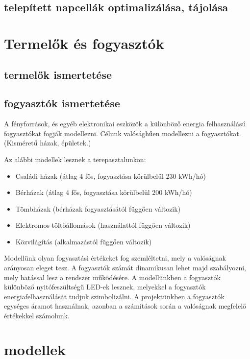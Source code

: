 \documentclass[
]{thesis-ekf}
\theoremstyle{definition}
\theoremstyle{remark}
\begin{document}
		\subsection{telepített napcellák optimalizálása, tájolása}
	\section{Termelők és fogyasztók}
		\subsection{termelők ismertetése}
		\subsection{fogyasztók ismertetése}
		\par A fényforrások, és egyéb elektronikai eszközök a különböző energia felhasználású fogyasztókat fogják modellezni. Célunk valósághűen modellezni a fogyasztókat. (Kisméretű házak, épületek.) 
		\par Az alábbi modellek lesznek a terepasztalunkon:
		\begin{itemize}
			\item Családi házak (átlag 4 fős, fogyasztása körülbelül 230 kWh/hó)
			\item Bérházak (átlag 4 fős, fogyasztása körülbelül 200 kWh/hó)
			\item Tömbházak (bérházak fogyasztásától függően változik)
			\item Elektromos töltőállomások (használattól függően változik)
			\item Közvilágítás (alkalmazástól függően változik)
		\end{itemize}
	
		Modellünk olyan fogyasztási értékeket fog szemléltetni, mely a valóságnak arányosan eleget tesz. A fogyasztók számát dinamikusan lehet majd szabályozni, mely hatással lesz a rendszer működésére. A modellünkben a fogyasztók különböző nyitófeszültségű LED-ek lesznek, melyekkel a fogyasztók energiafelhasználását tudjuk szimbolizálni. A projektünkben a fogyasztók egységes áramot használnak, azonban a számítások során a valóságnak megfelelő értékekkel számolunk.
		
	\section{modellek}
\end{document}
